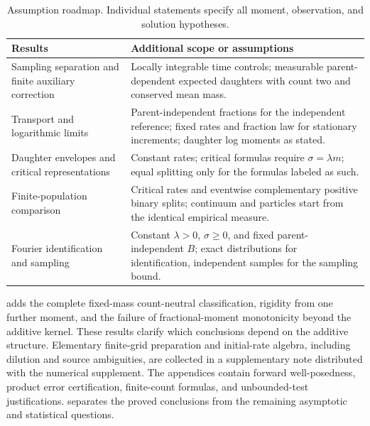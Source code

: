 \begin{table}[htbp]
\centering\small
\begin{tabular}{p{}p{}}
\toprule
Results & Additional scope or assumptions \\
\midrule
Sampling separation and finite auxiliary correction
& Locally integrable time controls; measurable parent-dependent expected
  daughters with count two and conserved mean mass. \\
Transport and logarithmic limits
& Parent-independent fractions for the independent reference; fixed rates
  and fraction law for stationary increments; daughter log moments as stated. \\
Daughter envelopes and critical representations
& Constant rates; critical formulas require $\sigma=\lambda m$;
  equal splitting only for the formulas labeled as such. \\
Finite-population comparison
& Critical rates and eventwise complementary positive binary splits;
  continuum and particles start from the identical empirical measure. \\
Fourier identification and sampling
& Constant $\lambda>0$, $\sigma\geq0$, and fixed parent-independent $B$;
  exact distributions for identification, independent samples for the sampling bound. \\
\bottomrule
\end{tabular}
\caption{Assumption roadmap. Individual statements specify all moment,
observation, and solution hypotheses.}
\label{tab:assumptions}
\end{table}

 adds the complete fixed-mass count-neutral
classification, rigidity from one further moment, and the failure of
fractional-moment monotonicity beyond the additive kernel. These results
clarify which conclusions depend on the additive structure.
Elementary finite-grid preparation and initial-rate algebra, including
dilution and source ambiguities, are collected in a supplementary note
distributed with the numerical supplement.
The appendices contain forward well-posedness, product error
certification, finite-count formulas, and unbounded-test justifications.
 separates the proved conclusions from the remaining
asymptotic and statistical questions.
